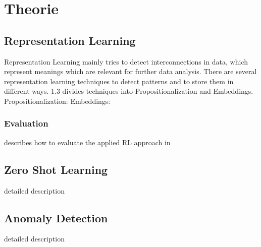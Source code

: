 \chapter{Theorie}\label{theory}
\section{Representation Learning}
Representation Learning mainly tries to detect interconnections in data, which represent meanings which are relevant for further data analysis. There are several representation learning techniques to detect patterns and to store them in different ways.\cite{lavrac_representation_2021} 1.3
divides techniques into Propositionalization and Embeddings.\\
Propositionalization:
Embeddings:

\subsection{Evaluation}
describes how to evaluate the applied RL approach in
\section{Zero Shot Learning}
detailed description
\section{Anomaly Detection}
detailed description
